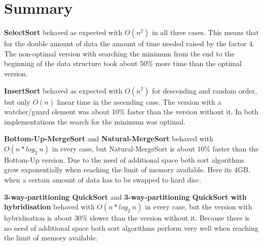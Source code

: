 \documentclass[11pt]{amsart}
\begin{document}
\newpage
\section{Summary}
%
%
\textbf{SelectSort} behaved as expected with $O(n^2)$ in all three cases. This means that for the double amount of data the amount of time needed raised by the factor 4. The non-optimal version with searching the minimum from the end to the beginning of the data structure took about 50\% more time than the optimal version.

\textbf{InsertSort} behaved as expected with $O(n^2)$ for descending and random order, but only $O(n)$ linear time in the ascending case. The version with a watcher/guard element was about 10\% faster than the version without it. In both implementations the search for the minimum was optimal.

\textbf{Bottom-Up-MergeSort} and \textbf{Natural-MergeSort}  behaved with $O(n*log_2~n)$ in every case, but Natural-MergeSort is about 10\% faster than the Bottom-Up version. Due to the need of additional space both sort algorithms grow exponentially when reaching the limit of memory available. Here its 4GB, when a certain amount of data has to be swapped to hard disc.

\textbf{3-way-partitioning QuickSort} and \textbf{3-way-partitioning QuickSort with hybridisation} behaved with $O(n*log_2~n)$ in every case, but the version with hybridisation is about 30\% slower than the version without it. Because there is no need of additional space both sort algorithms perform very well when reaching the limit of memory available.
\end{document}
